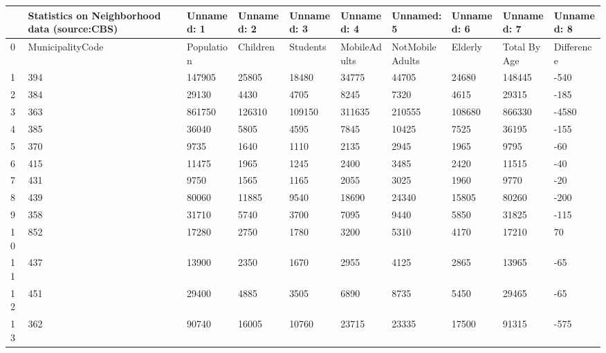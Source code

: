 \begin{tabular}{llllllllll}
\toprule
{} & Statistics on Neighborhood data (source:CBS) &  Unnamed: 1 & Unnamed: 2 & Unnamed: 3 &    Unnamed: 4 &       Unnamed: 5 & Unnamed: 6 &    Unnamed: 7 &  Unnamed: 8 \\
\midrule
0  &                             MunicipalityCode &  Population &   Children &   Students &  MobileAdults &  NotMobileAdults &    Elderly &  Total By Age &  Difference \\
1  &                                          394 &      147905 &      25805 &      18480 &         34775 &            44705 &      24680 &        148445 &        -540 \\
2  &                                          384 &       29130 &       4430 &       4705 &          8245 &             7320 &       4615 &         29315 &        -185 \\
3  &                                          363 &      861750 &     126310 &     109150 &        311635 &           210555 &     108680 &        866330 &       -4580 \\
4  &                                          385 &       36040 &       5805 &       4595 &          7845 &            10425 &       7525 &         36195 &        -155 \\
5  &                                          370 &        9735 &       1640 &       1110 &          2135 &             2945 &       1965 &          9795 &         -60 \\
6  &                                          415 &       11475 &       1965 &       1245 &          2400 &             3485 &       2420 &         11515 &         -40 \\
7  &                                          431 &        9750 &       1565 &       1165 &          2055 &             3025 &       1960 &          9770 &         -20 \\
8  &                                          439 &       80060 &      11885 &       9540 &         18690 &            24340 &      15805 &         80260 &        -200 \\
9  &                                          358 &       31710 &       5740 &       3700 &          7095 &             9440 &       5850 &         31825 &        -115 \\
10 &                                          852 &       17280 &       2750 &       1780 &          3200 &             5310 &       4170 &         17210 &          70 \\
11 &                                          437 &       13900 &       2350 &       1670 &          2955 &             4125 &       2865 &         13965 &         -65 \\
12 &                                          451 &       29400 &       4885 &       3505 &          6890 &             8735 &       5450 &         29465 &         -65 \\
13 &                                          362 &       90740 &      16005 &      10760 &         23715 &            23335 &      17500 &         91315 &        -575 \\
\bottomrule
\end{tabular}
